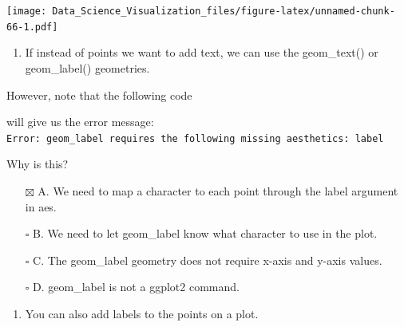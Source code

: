 \documentclass[
]{article}
\newenvironment{Shaded}{\begin{snugshade}}{\end{snugshade}}
\newcommand{\CommentTok}[1]{\textcolor[rgb]{0.56,0.35,0.01}{\textit{#1}}}
\newcommand{\DataTypeTok}[1]{\textcolor[rgb]{0.13,0.29,0.53}{#1}}
\newcommand{\KeywordTok}[1]{\textcolor[rgb]{0.13,0.29,0.53}{\textbf{#1}}}
\newcommand{\NormalTok}[1]{#1}
\newcommand{\OperatorTok}[1]{\textcolor[rgb]{0.81,0.36,0.00}{\textbf{#1}}}
\newcommand{\StringTok}[1]{\textcolor[rgb]{0.31,0.60,0.02}{#1}}
\providecommand{\tightlist}{%
  \setlength{\itemsep}{0pt}\setlength{\parskip}{0pt}}
\begin{document}
\texttt{[image: Data\_Science\_Visualization\_files/figure-latex/unnamed-chunk-66-1.pdf]}

\begin{enumerate}
\def\labelenumi{\arabic{enumi}.}
\setcounter{enumi}{6}
\tightlist
\item
  If instead of points we want to add text, we can use the geom\_text()
  or geom\_label() geometries.
\end{enumerate}

However, note that the following code

\begin{Shaded}
\end{Shaded}

will give us the error message:
\texttt{Error:\ geom\_label\ requires\ the\ following\ missing\ aesthetics:\ label}

Why is this?

\begin{itemize}
\tightlist
\item[$\boxtimes$]
  A. We need to map a character to each point through the label argument
  in aes.
\item[$\square$]
  B. We need to let geom\_label know what character to use in the plot.
\item[$\square$]
  C. The geom\_label geometry does not require x-axis and y-axis values.
\item[$\square$]
  D. geom\_label is not a ggplot2 command.
\end{itemize}

\begin{enumerate}
\def\labelenumi{\arabic{enumi}.}
\setcounter{enumi}{7}
\tightlist
\item
  You can also add labels to the points on a plot.
\end{enumerate}

\begin{Shaded}
\end{Shaded}
\end{document}
